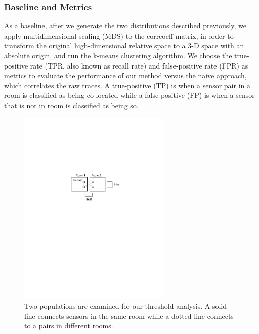 \subsubsection{Baseline and Metrics}

As a baseline, after we generate the two distributions described previously, we apply multidimensional scaling (MDS) to the corrcoeff matrix, in order to transform the original high-dimensional relative space to a 3-D space with an absolute origin, and run the k-means clustering algorithm.
We choose the true-positive rate (TPR, also known as recall rate) and false-positive rate (FPR) as metrics to evaluate the performance of our method versus the naive approach, which correlates the raw traces. A true-positive (TP) is when a sensor pair in a room is classified as being co-located 
while a false-positive (FP) is when a sensor that is not in room is classified as being so.

\begin{figure}[h!]
\centering
	\includegraphics[width=0.65\textwidth]{figs/Inter_intra_relationships}
\caption{Two populations are examined for our threshold analysis.  A solid line connects sensors in the same room while a dotted line connects
 to a pairs in different rooms.}
\label{fig:group}
\end{figure}

